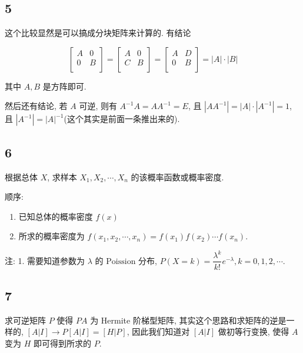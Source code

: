 \documentclass[a4paper, draft]{article}
\begin{document}
\subsection*{5}

这个比较显然是可以搞成分块矩阵来计算的. 有结论

$$
\begin{bmatrix}
    A & 0\\
    0 & B\\
\end{bmatrix}=
\begin{bmatrix}
    A & 0\\
    C & B\\
\end{bmatrix}=
\begin{bmatrix}
    A & D\\
    0 & B\\
\end{bmatrix}=|A|\cdot|B|
$$

其中 $A,B$ 是方阵即可.

然后还有结论, 若 $A$ 可逆, 则有 $A^{-1}A=AA^{-1}=E$, 
且 $|AA^{-1}|=|A|\cdot|A^{-1}|=1$, 
且 $|A^{-1}|=|A|^{-1}$(这个其实是前面一条推出来的).

\subsection*{6}

根据总体 $X$, 求样本 $X_1,X_2,\cdots,X_n$ 的该概率函数或概率密度.

顺序:  

\begin{enumerate}
    \item 已知总体的概率密度 $f(x)$
    \item 所求的概率密度为 $f(x_1,x_2,\cdots,x_n)=f(x_1)f(x_2)\cdots f(x_n)$.
\end{enumerate}

注:  
1. 需要知道参数为 $\lambda$ 的 $\text{Poission}$ 分布, $P(X=k)=\dfrac{\lambda^k}{k!}e^{-\lambda},k=0,1,2,\cdots$.

\subsection*{7}

求可逆矩阵 $P$ 使得 $PA$ 为 Hermite 阶梯型矩阵, 
其实这个思路和求矩阵的逆是一样的, $[A|I]\rightarrow P[A|I]=[H|P]$, 
因此我们知道对 $[A|I]$ 做初等行变换, 使得 $A$ 变为 $H$ 即可得到所求的 $P$.
\end{document}
